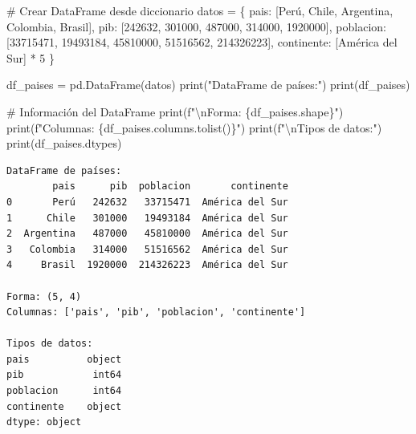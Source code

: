 \documentclass[
  doc,
  floatsintext,
  longtable,
  a4paper,
  nolmodern,
  notxfonts,
  notimes,
  12pt,
  colorlinks=true,linkcolor=blue,citecolor=blue,urlcolor=blue]{apa7}
\newenvironment{Shaded}{\begin{snugshade}}{\end{snugshade}}
\newcommand{\BuiltInTok}[1]{\textcolor[rgb]{0.00,0.23,0.31}{#1}}
\newcommand{\CharTok}[1]{\textcolor[rgb]{0.13,0.47,0.30}{#1}}
\newcommand{\CommentTok}[1]{\textcolor[rgb]{0.37,0.37,0.37}{#1}}
\newcommand{\DecValTok}[1]{\textcolor[rgb]{0.68,0.00,0.00}{#1}}
\newcommand{\NormalTok}[1]{\textcolor[rgb]{0.00,0.23,0.31}{#1}}
\newcommand{\OperatorTok}[1]{\textcolor[rgb]{0.37,0.37,0.37}{#1}}
\newcommand{\SpecialCharTok}[1]{\textcolor[rgb]{0.37,0.37,0.37}{#1}}
\newcommand{\SpecialStringTok}[1]{\textcolor[rgb]{0.13,0.47,0.30}{#1}}
\newcommand{\StringTok}[1]{\textcolor[rgb]{0.13,0.47,0.30}{#1}}
\begin{document}
\begin{Shaded}
\begin{Highlighting}[]
\CommentTok{\# Crear DataFrame desde diccionario}
\NormalTok{datos }\OperatorTok{=}\NormalTok{ \{}
    \StringTok{\textquotesingle{}pais\textquotesingle{}}\NormalTok{: [}\StringTok{\textquotesingle{}Perú\textquotesingle{}}\NormalTok{, }\StringTok{\textquotesingle{}Chile\textquotesingle{}}\NormalTok{, }\StringTok{\textquotesingle{}Argentina\textquotesingle{}}\NormalTok{, }\StringTok{\textquotesingle{}Colombia\textquotesingle{}}\NormalTok{, }\StringTok{\textquotesingle{}Brasil\textquotesingle{}}\NormalTok{],}
    \StringTok{\textquotesingle{}pib\textquotesingle{}}\NormalTok{: [}\DecValTok{242632}\NormalTok{, }\DecValTok{301000}\NormalTok{, }\DecValTok{487000}\NormalTok{, }\DecValTok{314000}\NormalTok{, }\DecValTok{1920000}\NormalTok{],}
    \StringTok{\textquotesingle{}poblacion\textquotesingle{}}\NormalTok{: [}\DecValTok{33715471}\NormalTok{, }\DecValTok{19493184}\NormalTok{, }\DecValTok{45810000}\NormalTok{, }\DecValTok{51516562}\NormalTok{, }\DecValTok{214326223}\NormalTok{],}
    \StringTok{\textquotesingle{}continente\textquotesingle{}}\NormalTok{: [}\StringTok{\textquotesingle{}América del Sur\textquotesingle{}}\NormalTok{] }\OperatorTok{*} \DecValTok{5}
\NormalTok{\}}

\NormalTok{df\_paises }\OperatorTok{=}\NormalTok{ pd.DataFrame(datos)}
\BuiltInTok{print}\NormalTok{(}\StringTok{"DataFrame de países:"}\NormalTok{)}
\BuiltInTok{print}\NormalTok{(df\_paises)}

\CommentTok{\# Información del DataFrame}
\BuiltInTok{print}\NormalTok{(}\SpecialStringTok{f"}\CharTok{\textbackslash{}n}\SpecialStringTok{Forma: }\SpecialCharTok{\{}\NormalTok{df\_paises}\SpecialCharTok{.}\NormalTok{shape}\SpecialCharTok{\}}\SpecialStringTok{"}\NormalTok{)}
\BuiltInTok{print}\NormalTok{(}\SpecialStringTok{f"Columnas: }\SpecialCharTok{\{}\NormalTok{df\_paises}\SpecialCharTok{.}\NormalTok{columns}\SpecialCharTok{.}\NormalTok{tolist()}\SpecialCharTok{\}}\SpecialStringTok{"}\NormalTok{)}
\BuiltInTok{print}\NormalTok{(}\SpecialStringTok{f"}\CharTok{\textbackslash{}n}\SpecialStringTok{Tipos de datos:"}\NormalTok{)}
\BuiltInTok{print}\NormalTok{(df\_paises.dtypes)}
\end{Highlighting}
\end{Shaded}

\begin{verbatim}
DataFrame de países:
        pais      pib  poblacion       continente
0       Perú   242632   33715471  América del Sur
1      Chile   301000   19493184  América del Sur
2  Argentina   487000   45810000  América del Sur
3   Colombia   314000   51516562  América del Sur
4     Brasil  1920000  214326223  América del Sur

Forma: (5, 4)
Columnas: ['pais', 'pib', 'poblacion', 'continente']

Tipos de datos:
pais          object
pib            int64
poblacion      int64
continente    object
dtype: object
\end{verbatim}
\end{document}

